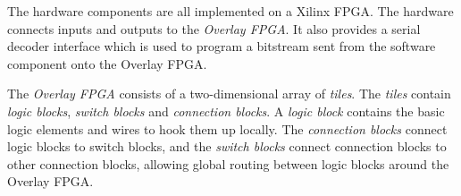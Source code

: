 The hardware components are all implemented on a Xilinx FPGA.
The hardware connects inputs and outputs to the \emph{Overlay FPGA}.
It also provides a serial decoder interface which is used to program a bitstream sent from the software component onto the Overlay FPGA.

The \emph{Overlay FPGA} consists of a two-dimensional array of \emph{tiles}.
The \emph{tiles} contain \emph{logic blocks}, \emph{switch blocks} and \emph{connection blocks}.
A \emph{logic block} contains the basic logic elements and wires to hook them up locally.
The \emph{connection blocks} connect logic blocks to switch blocks, and the \emph{switch blocks} connect connection blocks to other connection blocks, allowing global routing between logic blocks around the Overlay FPGA.



